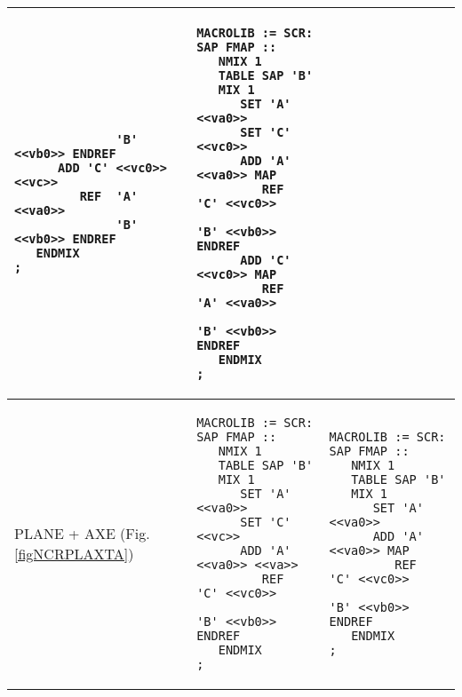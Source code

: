 \begin{center}
\begin{supertabular}{|p{0.1\textwidth}|p{0.4\textwidth}|p{0.4\textwidth}|}
\begin{verbatim}
              'B' <<vb0>> ENDREF
      ADD 'C' <<vc0>> <<vc>>
         REF  'A' <<va0>> 
              'B' <<vb0>> ENDREF
   ENDMIX
;
\end{verbatim} &
\begin{verbatim}
MACROLIB := SCR: SAP FMAP ::
   NMIX 1 
   TABLE SAP 'B' 
   MIX 1 
      SET 'A' <<va0>>
      SET 'C' <<vc0>>
      ADD 'A' <<va0>> MAP
         REF  'C' <<vc0>> 
              'B' <<vb0>> ENDREF
      ADD 'C' <<vc0>> MAP
         REF  'A' <<va0>> 
              'B' <<vb0>> ENDREF
   ENDMIX
;
\end{verbatim} \\
\hline
PLANE + AXE (Fig. \ref{figNCRPLAXTA}) & 
\begin{verbatim}
MACROLIB := SCR: SAP FMAP ::
   NMIX 1
   TABLE SAP 'B' 
   MIX 1 
      SET 'A' <<va0>>
      SET 'C' <<vc>>
      ADD 'A' <<va0>> <<va>>
         REF  'C' <<vc0>> 
              'B' <<vb0>> ENDREF
   ENDMIX
;
\end{verbatim} &
\begin{verbatim}
MACROLIB := SCR: SAP FMAP ::
   NMIX 1
   TABLE SAP 'B' 
   MIX 1 
      SET 'A' <<va0>>
      ADD 'A' <<va0>> MAP
         REF  'C' <<vc0>> 
              'B' <<vb0>> ENDREF
   ENDMIX
;
\end{verbatim} \\
\hline
\end{supertabular}
\end{center}

\clearpage

